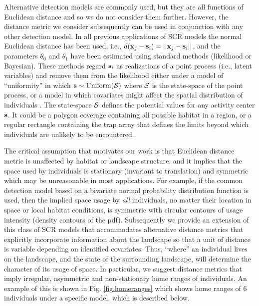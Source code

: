 \documentclass[12pt]{article}
\begin{document}
\begin{spacing}{1.8}
Alternative detection models are commonly used, but they are all
functions of Euclidean distance and so we do not consider them
further. However, the distance metric we consider subsequently can be
used in conjunction with any other detection model.  In all previous
applications of SCR models the normal Euclidean distance has been
used, i.e., $ d({\bf x}_{j} - {\bf s}_{i}) = ||{\bf x}_{j} - {\bf
  s}_{i}||$, and the parameters $\theta_0$ and $\theta_1$ have been
estimated using standard methods (likelihood or Bayesian). These
methods regard ${\bf s}_{i}$ as realizations of a point process (i.e.,
latent variables) and remove them from the likelihood either under a
model of ``uniformity'' in which ${\bf s} \sim \mbox{Uniform}({\cal
  S})$ where ${\cal S}$ is the state-space of the point process, or a
model in which covariates might affect the spatial distribution of
individuals \citep{borchers_efford:2008}. The state-space ${\cal S}$
defines the potential values for any activity center ${\bf s}$.  It
could be a polygon coverage containing all possible habitat in a
region, or a regular rectangle containing the trap array that defines
the limits beyond which individuals are unlikely to be encountered.

The critical assumption that motivates our work is that Euclidean
distance metric is unaffected by habitat or landscape structure, and
it implies that the space used by individuals is stationary (invariant
to translation) and symmetric
which may be unreasonable in most applications.  For example, if the
common detection model based on a bivariate normal probability
distribution function is used, then the implied space usage by {\it
  all} individuals, no matter their location in space or local habitat
conditions, is symmetric with circular contours of usage intensity
(density contours of the pdf).  Subsequently we provide an extension
of this class of SCR models that accommodates alternative distance
metrics that explicitly incorporate information about the landscape so
that a unit of distance is variable depending on identified
covariates. Thus, ``where'' an individual lives on the landscape, and
the state of the surrounding landscape, will determine the character
of its usage of space. In particular, we suggest distance metrics that
imply irregular, asymmetric and non-stationary home ranges of
individuals. An example of this is shown in Fig. \ref{fig.homeranges}
which shows home ranges of 6 individuals under a specific model, which
is described below.


\end{spacing}
\end{document}

